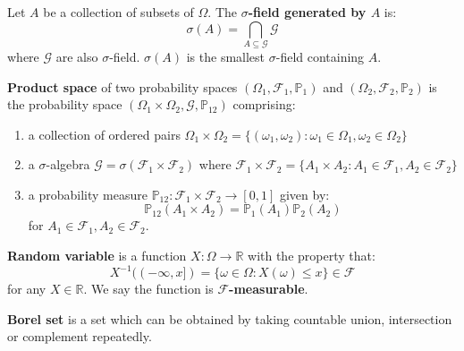 \documentclass{huhtakm-template-book}
\newcommand{\prob}{\mathbb{P}}
\begin{document}
    \begin{sdefn}
        Let $A$ be a collection of subsets of $\Omega$. The \textbf{$\sigma$-field generated by $A$} is:
        \begin{equation*}
            \sigma(A)=\bigcap_{A\subseteq\mathcal{G}}\mathcal{G}
        \end{equation*}
        where $\mathcal{G}$ are also $\sigma$-field. $\sigma(A)$ is the smallest $\sigma$-field containing $A$.
    \end{sdefn}
    \begin{sdefn}
        \textbf{Product space} of two probability spaces $(\Omega_{1},\mathcal{F}_{1},\prob_{1})$ and $(\Omega_{2},\mathcal{F}_{2},\prob_{2})$ is the probability space $(\Omega_{1}\times\Omega_{2},\mathcal{G},\prob_{12})$ comprising:
        \begin{enumerate}
            \item a collection of ordered pairs $\Omega_{1}\times\Omega_{2}=\{(\omega_{1},\omega_{2}):\omega_{1}\in\Omega_{1},\omega_{2}\in\Omega_{2}\}$
            \item a $\sigma$-algebra $\mathcal{G}=\sigma(\mathcal{F}_{1}\times\mathcal{F}_{2})$ where $\mathcal{F}_{1}\times\mathcal{F}_{2}=\{A_{1}\times A_{2}:A_{1}\in\mathcal{F}_{1},A_{2}\in\mathcal{F}_{2}\}$ 
            \item a probability measure $\prob_{12}:\mathcal{F}_{1}\times\mathcal{F}_{2}\to [0,1]$ given by:
            \begin{equation*}
                \prob_{12}(A_{1}\times A_{2})=\prob_{1}(A_{1})\prob_{2}(A_{2})
            \end{equation*}
            for $A_{1}\in\mathcal{F}_{1},A_{2}\in\mathcal{F}_{2}$.
        \end{enumerate}
    \end{sdefn}
    \begin{sdefn}
        \textbf{Random variable} is a function $X:\Omega\to\mathbb{R}$ with the property that:
        \begin{equation*}
            X^{-1}((-\infty,x])=\{\omega\in\Omega:X(\omega)\leq x\}\in\mathcal{F}
        \end{equation*}
        for any $X\in\mathbb{R}$. We say the function is \textbf{$\mathcal{F}$-measurable}.
    \end{sdefn}
    \begin{sdefn}
        \textbf{Borel set} is a set which can be obtained by taking countable union, intersection or complement repeatedly.
    \end{sdefn}
\end{document}
